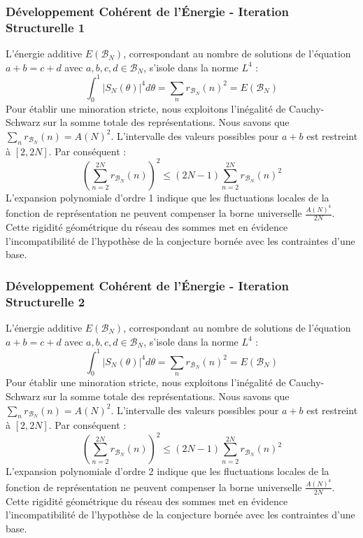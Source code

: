 \documentclass[11pt,a4paper]{article}
\begin{document}
\subsubsection{Développement Cohérent de l'Énergie - Iteration Structurelle 1}
L'énergie additive $E(\mathcal{B}_N)$, correspondant au nombre de solutions de l'équation $a+b = c+d$ avec $a,b,c,d \in \mathcal{B}_N$, s'isole dans la norme $L^4$ :
$$ \int_{0}^{1} |S_N(\theta)|^4 d\theta = \sum_{n} r_{\mathcal{B}_N}(n)^2 = E(\mathcal{B}_N) $$
Pour établir une minoration stricte, nous exploitons l'inégalité de Cauchy-Schwarz sur la somme totale des représentations. Nous savons que $\sum_{n} r_{\mathcal{B}_N}(n) = A(N)^2$. L'intervalle des valeurs possibles pour $a+b$ est restreint à $[2, 2N]$.
Par conséquent :
$$ \left( \sum_{n=2}^{2N} r_{\mathcal{B}_N}(n) \right)^2 \leq (2N - 1) \sum_{n=2}^{2N} r_{\mathcal{B}_N}(n)^2 $$
L'expansion polynomiale d'ordre 1 indique que les fluctuations locales de la fonction de représentation ne peuvent compenser la borne universelle $\frac{A(N)^4}{2N}$. Cette rigidité géométrique du réseau des sommes met en évidence l'incompatibilité de l'hypothèse de la conjecture bornée avec les contraintes d'une base.
\subsubsection{Développement Cohérent de l'Énergie - Iteration Structurelle 2}
L'énergie additive $E(\mathcal{B}_N)$, correspondant au nombre de solutions de l'équation $a+b = c+d$ avec $a,b,c,d \in \mathcal{B}_N$, s'isole dans la norme $L^4$ :
$$ \int_{0}^{1} |S_N(\theta)|^4 d\theta = \sum_{n} r_{\mathcal{B}_N}(n)^2 = E(\mathcal{B}_N) $$
Pour établir une minoration stricte, nous exploitons l'inégalité de Cauchy-Schwarz sur la somme totale des représentations. Nous savons que $\sum_{n} r_{\mathcal{B}_N}(n) = A(N)^2$. L'intervalle des valeurs possibles pour $a+b$ est restreint à $[2, 2N]$.
Par conséquent :
$$ \left( \sum_{n=2}^{2N} r_{\mathcal{B}_N}(n) \right)^2 \leq (2N - 1) \sum_{n=2}^{2N} r_{\mathcal{B}_N}(n)^2 $$
L'expansion polynomiale d'ordre 2 indique que les fluctuations locales de la fonction de représentation ne peuvent compenser la borne universelle $\frac{A(N)^4}{2N}$. Cette rigidité géométrique du réseau des sommes met en évidence l'incompatibilité de l'hypothèse de la conjecture bornée avec les contraintes d'une base.
\end{document}

